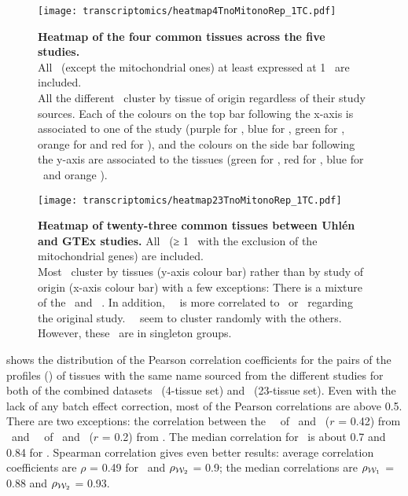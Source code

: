 \begin{figure}[!htpb]
    \texttt{[image: transcriptomics/heatmap4TnoMitonoRep\_1TC.pdf]}\centering
    \caption[Heatmap of the 4 common tissues across the 5 studies]%
    {\label{fig:noMitoNoRep4T}\textbf{Heatmap of the four common tissues
    across the five studies.}\\All \pcgs\ (except the mitochondrial
    ones) at least expressed at 1 \FPKM\ are included.\\All the
    different \treps\ cluster by tissue of origin
    regardless of their study sources.
    Each of the colours on the top bar following the x-axis
    is associated to one of the study
    (purple for \uhlen, blue for \brawand, green for \gtex,
    orange for \castle{} and red for \ibm{}),
    and the colours on the side bar following the y-axis
    are associated to the tissues
    (green for \kidney, red for \heart, blue for \testis\ and orange \liver).}
\end{figure}

\begin{figure}[!htpb]
    \texttt{[image: transcriptomics/heatmap23TnoMitonoRep\_1TC.pdf]}\centering
    \caption[Heatmap of 23 common tissues between Uhlén and GTEx studies]%
    {\label{fig:noMitoNoRep23T}%
    \textbf{Heatmap of twenty-three common tissues between Uhlén and GTEx studies.}
    All \pcgs\ (≥ 1 \FPKM\ with the exclusion of the mitochondrial
    genes) are included.\\Most \treps\ cluster by tissues (y-axis colour bar)
    rather than by study of origin (x-axis colour bar)
    with a few exceptions:
    There is a mixture of the \fallopian\
    and \Ovary\ \treps.
    In addition, \Salivary\ \treps\ is more correlated to
    \Oesophagus\ or \Stomach\ regarding the original study.
    \Bladder\ \treps\ seem to cluster randomly with the others.
    However, these \treps\ are in singleton groups.}
\end{figure}

 shows the distribution of the Pearson correlation
coefficients for the pairs of the profiles (\treps) of tissues with the same name
sourced from the different studies
for both of the combined datasets \setOne\ (4-tissue set)
and \setTwo\ (23-tissue set).
Even with the lack of any batch effect correction,
most of the Pearson correlations are above 0.5.
There are two exceptions: the
correlation between the \Testis\ \treps\ of \castle\ and \vt\ ($r$ = 0.42)
from \setOne\ and
\Salivary\ \treps\ of \uhlen\ and \gtex\ ($r$ = 0.2)
from \setTwo.
The median correlation for \setOne\ is
about 0.7 and 0.84 for \setTwo.
Spearman correlation gives even better results:
average correlation coefficients are $\rho$ = 0.49 for \setOne\
and $\rho_{\text{$\mathcal{W}_2$}}$ = 0.9;
the median correlations are $\rho_{\text{$\mathcal{W}_1$}}$ = 0.88
and $\rho_{\text{$\mathcal{W}_2$}}$ = 0.93.

